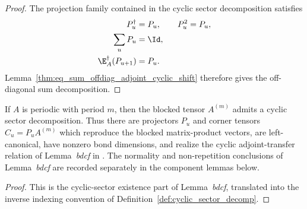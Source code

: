 \begin{proof}\leanok
    The projection family contained in the cyclic sector decomposition
    satisfies
    \begin{align}
        P_u^\dagger           & =P_u,\qquad P_u^2=P_u, \notag \\
        \sum_uP_u             & =\Id, \notag                  \\
        \E_A^\dagger(P_{u+1}) & =P_u. \notag
    \end{align}
    Lemma~\ref{thm:eq_sum_offdiag_adjoint_cyclic_shift} therefore gives the
    off-diagonal sum decomposition.
\end{proof}

\begin{lemma}
    \label{thm:cyclic_sector_decomp_after_blocking_periodic}
    \leanok
    If $A$ is periodic with period $m$, then the blocked tensor $A^{(m)}$
    admits a cyclic sector decomposition. Thus there are projectors $P_u$ and
    corner tensors $C_u=P_u A^{(m)}$ which reproduce the blocked matrix-product
    vectors, are left-canonical, have nonzero bond dimensions, and realize the
    cyclic adjoint-transfer relation of Lemma~\emph{bdcf} in
    \cite[lines~404--423]{DeLasCuevas2017Irreducible}. The normality and
    non-repetition conclusions of Lemma~\emph{bdcf} are recorded separately in
    the component lemmas below.
\end{lemma}

\begin{proof}\leanok
    This is the cyclic-sector existence part of Lemma~\emph{bdcf}, translated
    into the inverse indexing convention of
    Definition~\ref{def:cyclic_sector_decomp}.
\end{proof}


